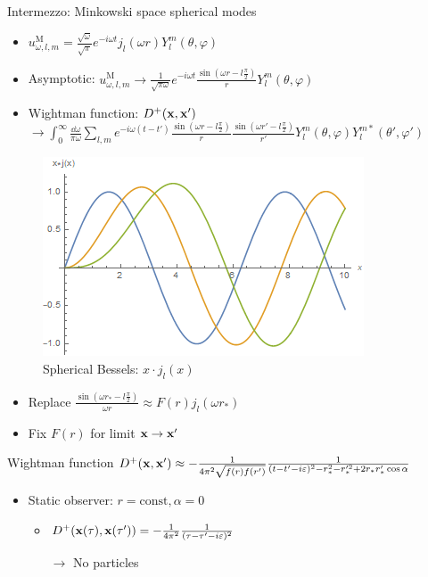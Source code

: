 \documentclass{beamer}
\newcommand{\upd}[1]{^\mathrm{#1}}
\begin{document}
\begin{frame}{Intermezzo: Minkowski space spherical modes}
\begin{itemize}
	\item \(u_{\omega,l,m}\upd{M} = \frac{\sqrt{\omega}}{\sqrt{\pi}} e^{- i \omega t} j_l(\omega r) Y_l^m(\theta,\varphi)\)
	\item Asymptotic: \(u_{\omega,l,m}\upd{M} \to \frac{1}{\sqrt{\pi\omega}} e^{- i \omega t} \frac{\sin(\omega r - l\frac{\pi}{2})}{r} Y_l^m(\theta,\varphi)\)
	\item Wightman function: \(D^+(\vb{x},\vb{x}')\)
	\(\to \int_0^\infty \frac{\dd{\omega}}{\pi\omega} \sum_{l,m} e^{-i\omega(t-t')} \frac{\sin(\omega r - l\frac{\pi}{2})}{r} \frac{\sin(\omega r' - l\frac{\pi}{2})}{r'} Y_l^m(\theta,\varphi) Y_l^{m*}(\theta',\varphi')\)
\end{itemize}
\begin{figure}
\centering
\includegraphics[scale=0.5]{plot/sphericalbessel.png}
\caption{Spherical Bessels: \(x\cdot j_l(x)\)}
\end{figure}
\end{frame}

\begin{frame}
\begin{itemize}
	\item Replace \(\frac{\sin(\omega r_* - l\frac{\pi}{2})}{\omega r} \approx F(r) j_l(\omega r_*)\)
	\item Fix \(F(r)\) for limit \(\vb{x} \to \vb{x}'\)
\end{itemize}
\begin{block}{Wightman function}
	\(D^+(\vb{x}, \vb{x}') \approx -\frac{1}{4\pi^2 \sqrt{f(r)f(r')}} \frac{1}{(t-t'-i\varepsilon)^2 - r_*^2 - r_*'^2 + 2r_*r_*' \cos{\alpha}}\)
\end{block}
\begin{itemize}
	\item Static observer: \(r = \mathrm{const}, \alpha = 0\)
	\begin{itemize}
		\item \(D^+(\vb{x}(\tau), \vb{x}(\tau')) =  -\frac{1}{4\pi^2} \frac{1}{(\tau-\tau'-i\varepsilon)^2}\)
		\item[\(\to\)] No particles
	\end{itemize}
\end{itemize}
\end{frame}
\end{document}
